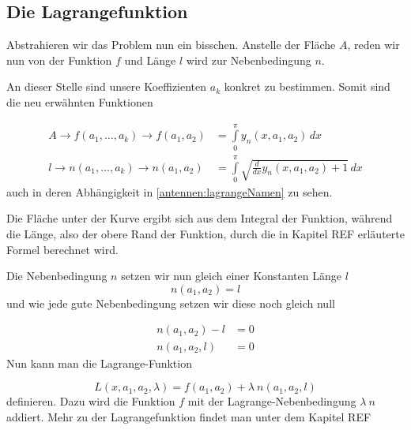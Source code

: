 \subsection{Die Lagrangefunktion \label{antennen:lagrangeFunktionen}}


Abstrahieren wir das Problem nun ein bisschen. Anstelle der Fläche $A$, reden wir nun von 
der Funktion $f$ und Länge $l$ wird zur Nebenbedingung $n$. 

An dieser Stelle sind unsere Koeffizienten $a_k$ konkret zu bestimmen. 
Somit sind die neu erwähnten Funktionen 

\begin{equation}
\begin{aligned}
	A
	\rightarrow
	f(a_1,\ldots,a_k)
	\rightarrow
	f(a_1,a_2)
	&=
	\int\limits_{0}^{\pi} y_n(x,a_1,a_2)\, dx
	\\
	l
	\rightarrow
	n(a_1,\ldots,a_k)
	\rightarrow
	n(a_1,a_2)
	&=
	\int\limits_{0}^{\pi} \sqrt{\frac{d}{d x} y_n\left(x, a_1, a_2\right)+1}\, dx
\end{aligned}
\label{antennen:lagrangeNamen}
\end{equation}
auch in deren Abhängigkeit in \eqref{antennen:lagrangeNamen} zu sehen. 

Die Fläche unter der Kurve ergibt sich aus dem Integral der Funktion, 
während die Länge, also der obere Rand der Funktion, durch die in Kapitel REF  %
erläuterte Formel berechnet wird. 

Die Nebenbedingung $n$ setzen wir nun gleich einer Konstanten Länge $l$
\begin{equation}
n(a_1, a_2)
=
l
\label{antennen:constNebenbed}
\end{equation}
und wie jede gute Nebenbedingung setzen wir diese noch gleich null

\begin{equation}
\begin{aligned}
	n(a_1, a_2) - l
	&=
	0
	\\
	n(a_1, a_2, l)
	&=
	0
\label{antennen:fertigeNebenbed}
\end{aligned}
\end{equation}
Nun kann man die Lagrange-Funktion

\begin{equation}
L(x,a_1,a_2,\lambda)
= 
f(a_1,a_2)+\lambda \: n(a_1,a_2, l)
\end{equation}
definieren. Dazu wird die Funktion $f$ mit der Lagrange-Nebenbedingung $\lambda \: n$ addiert.
Mehr zu der Lagrangefunktion findet man unter dem Kapitel REF %

